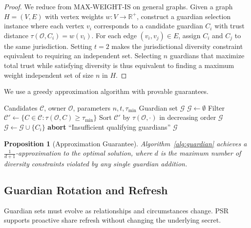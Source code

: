 \documentclass[11pt,a4paper,twocolumn]{article}
\newtheorem{proposition}[theorem]{Proposition}
\begin{document}
\begin{proof}
We reduce from MAX-WEIGHT-IS on general graphs. Given a graph $H = (V, E)$ with vertex weights $w: V \to \mathbb{R}^+$, construct a guardian selection instance where each vertex $v_i$ corresponds to a candidate guardian $C_i$ with trust distance $\tau(\mathcal{O}, C_i) = w(v_i)$. For each edge $(v_i, v_j) \in E$, assign $C_i$ and $C_j$ to the same jurisdiction. Setting $t = 2$ makes the jurisdictional diversity constraint equivalent to requiring an independent set. Selecting $n$ guardians that maximize total trust while satisfying diversity is thus equivalent to finding a maximum weight independent set of size $n$ in $H$.
\end{proof}

We use a greedy approximation algorithm with provable guarantees.

\begin{algorithm}[H]
\caption{Greedy Guardian Selection}\label{alg:guardian}
\begin{algorithmic}[1]
\REQUIRE Candidates $\mathcal{C}$, owner $\mathcal{O}$, parameters $n, t, \tau_{\min}$
\ENSURE Guardian set $\mathcal{G}$
\STATE $\mathcal{G} \leftarrow \emptyset$
\STATE Filter $\mathcal{C}' \leftarrow \{C \in \mathcal{C} : \tau(\mathcal{O}, C) \geq \tau_{\min}\}$
\STATE Sort $\mathcal{C}'$ by $\tau(\mathcal{O}, \cdot)$ in decreasing order
    \RETURN $\mathcal{G}$
  \ENDIF
    \STATE $\mathcal{G} \leftarrow \mathcal{G} \cup \{C_i\}$
  \ENDIF
\ENDFOR
{}
  \STATE \textbf{abort} ``Insufficient qualifying guardians''
\ENDIF
\RETURN $\mathcal{G}$
\end{algorithmic}
\end{algorithm}

\begin{proposition}[Approximation Guarantee]
Algorithm~\ref{alg:guardian} achieves a $\frac{1}{d+1}$-approximation to the optimal solution, where $d$ is the maximum number of diversity constraints violated by any single guardian addition.
\end{proposition}

\subsection{Guardian Rotation and Refresh}

Guardian sets must evolve as relationships and circumstances change. PSR supports proactive share refresh without changing the underlying secret.
\end{document}
